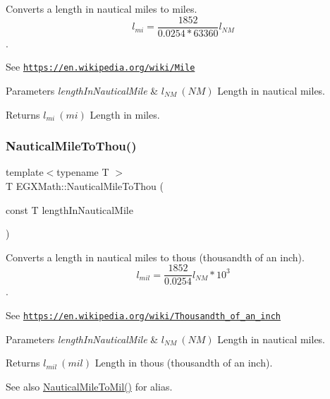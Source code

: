 Converts a length in nautical miles to miles. \[ l_{mi}=\frac{1852}{0.0254 * 63360} l_{NM} \]. 

See \href{https://en.wikipedia.org/wiki/Mile}{\tt https\+://en.\+wikipedia.\+org/wiki/\+Mile} 
\begin{DoxyParams}{Parameters}
{\em length\+In\+Nautical\+Mile} & $ l_{NM}\ (NM)$ Length in nautical miles. \\
\hline
\end{DoxyParams}
\begin{DoxyReturn}{Returns}
$ l_{mi}\ (mi)$ Length in miles. 
\end{DoxyReturn}
\mbox{\label{group___e_g_x_math-_conversions-_length_conversions-_nautical-_nautical_mile-_imperial_ga2791d7d115ca8640a88ce3180db9dddb}} 
\subsubsection{\texorpdfstring{Nautical\+Mile\+To\+Thou()}{NauticalMileToThou()}}
{\footnotesize\ttfamily template$<$typename T $>$ \\
T E\+G\+X\+Math\+::\+Nautical\+Mile\+To\+Thou (\begin{DoxyParamCaption}\item[{const T}]{length\+In\+Nautical\+Mile }\end{DoxyParamCaption})}



Converts a length in nautical miles to thous (thousandth of an inch). \[ l_{mil}= \frac{1852}{0.0254} l_{NM} * 10^{3} \]. 

See \href{https://en.wikipedia.org/wiki/Thousandth_of_an_inch}{\tt https\+://en.\+wikipedia.\+org/wiki/\+Thousandth\+\_\+of\+\_\+an\+\_\+inch} 
\begin{DoxyParams}{Parameters}
{\em length\+In\+Nautical\+Mile} & $ l_{NM}\ (NM)$ Length in nautical miles. \\
\hline
\end{DoxyParams}
\begin{DoxyReturn}{Returns}
$ l_{mil}\ (mil)$ Length in thous (thousandth of an inch). 
\end{DoxyReturn}
\begin{DoxySeeAlso}{See also}
\mbox{\hyperlink{group___e_g_x_math-_conversions-_length_conversions-_nautical-_nautical_mile-_imperial_ga30322f1dff254ba1eff05b0d10617fe7}{Nautical\+Mile\+To\+Mil()}} for alias. 
\end{DoxySeeAlso}
\mbox{\label{group___e_g_x_math-_conversions-_length_conversions-_nautical-_nautical_mile-_imperial_ga649c499537b8934186bab8dcdee6d45e}} 
